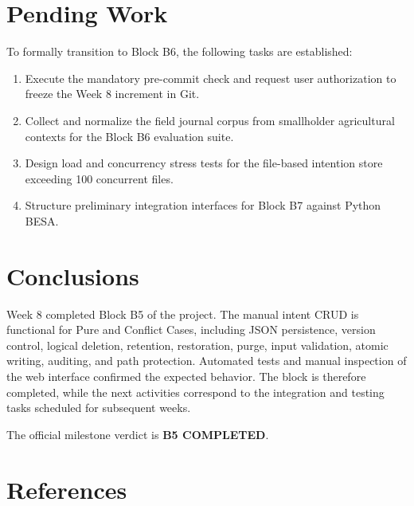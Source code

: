 \documentclass[11pt,a4paper]{article}
\begin{document}
\section{Pending Work}

To formally transition to Block B6, the following tasks are established:
\begin{enumerate}[itemsep=2pt]
    \item Execute the mandatory pre-commit check and request user authorization to freeze the Week 8 increment in Git.
    \item Collect and normalize the field journal corpus from smallholder agricultural contexts for the Block B6 evaluation suite.
    \item Design load and concurrency stress tests for the file-based intention store exceeding 100 concurrent files.
    \item Structure preliminary integration interfaces for Block B7 against Python BESA.
\end{enumerate}

\section{Conclusions}

Week 8 completed Block B5 of the project. The manual intent CRUD is functional for Pure and Conflict Cases, including JSON persistence, version control, logical deletion, retention, restoration, purge, input validation, atomic writing, auditing, and path protection. Automated tests and manual inspection of the web interface confirmed the expected behavior. The block is therefore completed, while the next activities correspond to the integration and testing tasks scheduled for subsequent weeks.

The official milestone verdict is \textbf{B5 COMPLETED}.

\section{References}
\end{document}
